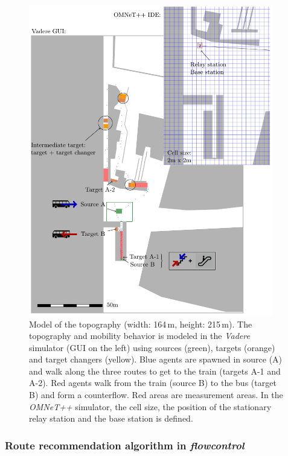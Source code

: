 \begin{figure}
\includegraphics[width=0.95\textwidth]{../figures/investigation/RealisticScenario/topographymodel/topographymodel.pdf} 
\caption[Model of the topography]{Model of the topography (width: 164\,m, height: 215\,m). The topography and mobility behavior is modeled in the \textit{Vadere} simulator (GUI on the left) using sources (green), targets (orange) and target changers (yellow). Blue agents are spawned in source (A) and walk along the three routes to get to the train (targets A-1 and A-2). Red agents walk from the train (source B) to the bus (target B) and form a counterflow. Red areas are measurement areas. In the \textit{OMNeT++} simulator, the cell size, the position of the stationary relay station and the base station is defined.}
\label{fig:topomodel}
\end{figure}



\subsubsection{Route recommendation algorithm in \textit{flowcontrol}}

